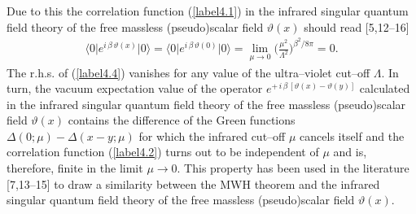 \documentclass[a4paper,12pt] {article}
\begin{document}
Due to this the correlation function (\ref{label4.1}) in the infrared
singular quantum field theory of the free massless (pseudo)scalar
field $\vartheta(x)$ should read [5,12--16]
%
\begin{eqnarray}\label{label4.4}
\Big\langle 0\Big|e^{\textstyle
i\,\beta\,\vartheta(x)}\Big|0\Big\rangle = \Big\langle
0\Big|e^{\textstyle i\,\beta\,\vartheta(0)}\Big|0\Big\rangle
=\lim_{\textstyle \mu \to 0}
\Bigg(\frac{\mu^2}{\Lambda^2}\Bigg)^{\textstyle \beta^2/8\pi} = 0.
\end{eqnarray}
%
The r.h.s. of (\ref{label4.4}) vanishes for any value of the
ultra--violet cut--off $\Lambda$. In turn, the vacuum expectation
value of the operator $e^{\textstyle +\,i\,\beta\,[\vartheta(x) -
\vartheta(y)]}$ calculated in the infrared singular quantum field
theory of the free massless (pseudo)scalar field $\vartheta(x)$
contains the difference of the Green functions $\Delta(0;\mu) -
\Delta(x-y;\mu)$ for which the infrared cut--off $\mu$ cancels itself
and the correlation function (\ref{label4.2}) turns out to be
independent of $\mu$ and is, therefore, finite in the limit $\mu \to
0$. This property has been used in the literature [7,13--15] to draw a
similarity between the MWH theorem and the infrared singular quantum
field theory of the free massless (pseudo)scalar field $\vartheta(x)$.
\end{document}
